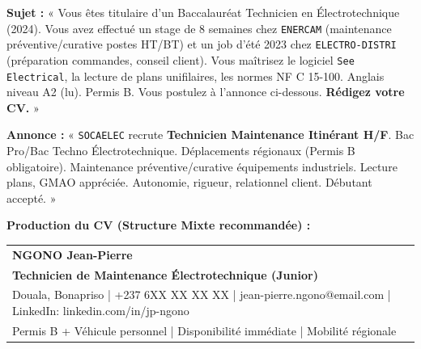 \documentclass[11pt]{article}
\begin{document}
\begin{exoresolu}
\textbf{Sujet :} « Vous êtes titulaire d'un Baccalauréat Technicien en Électrotechnique (2024). Vous avez effectué un stage de 8 semaines chez \texttt{ENERCAM} (maintenance préventive/curative postes HT/BT) et un job d'été 2023 chez \texttt{ELECTRO-DISTRI} (préparation commandes, conseil client). Vous maîtrisez le logiciel \texttt{See Electrical}, la lecture de plans unifilaires, les normes NF C 15-100. Anglais niveau A2 (lu). Permis B. Vous postulez à l'annonce ci-dessous. \textbf{Rédigez votre CV.} »

\textbf{Annonce :} « \texttt{SOCAELEC} recrute \textbf{Technicien Maintenance Itinérant H/F}. Bac Pro/Bac Techno Électrotechnique. Déplacements régionaux (Permis B obligatoire). Maintenance préventive/curative équipements industriels. Lecture plans, GMAO appréciée. Autonomie, rigueur, relationnel client. Débutant accepté. »

\textbf{Production du CV (Structure Mixte recommandée) :}

\begin{center}
\begin{tabularx}{\linewidth}{|X|}\hline
\textbf{NGONO Jean-Pierre} \\
\textbf{Technicien de Maintenance Électrotechnique (Junior)} \\
Douala, Bonapriso | +237 6XX XX XX XX | jean-pierre.ngono@email.com | LinkedIn: linkedin.com/in/jp-ngono \\
Permis B + Véhicule personnel | Disponibilité immédiate | Mobilité régionale \\ \hline
\end{tabularx}
\end{center}


\end{exoresolu}
\end{document}

